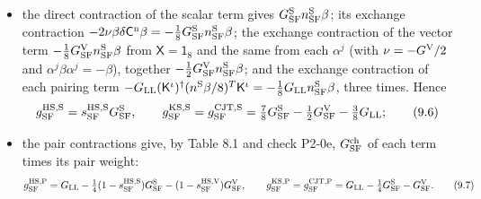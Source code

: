 \documentclass[
  10pt,
]{article}
\providecommand{\tightlist}{%
  \setlength{\itemsep}{0pt}\setlength{\parskip}{0pt}}
\begin{document}
\begin{itemize}
\tightlist
\item
  the direct contraction of the scalar term gives
  \(G^{\rm S}_{\rm SF}n^{\rm S}_{\rm SF}\beta\); its exchange
  contraction
  \(-2\nu\beta\delta\mathsf C^{\rm n}\beta=-\tfrac18G^{\rm S}_{\rm SF}n^{\rm S}_{\rm SF}\beta\);
  the exchange contraction of the vector term
  \(-\tfrac18G^{\rm V}_{\rm SF}n^{\rm S}_{\rm SF}\beta\) from
  \(\mathsf X=\mathsf 1_8\) and the same from each \(\alpha^j\) (with
  \(\nu=-G^{\rm V}/2\) and \(\alpha^j\beta\alpha^j=-\beta\)), together
  \(-\tfrac12G^{\rm V}_{\rm SF}n^{\rm S}_{\rm SF}\beta\); and the
  exchange contraction of each pairing term
  \(-G_{\rm LL}(\mathsf K^\iota)^\dagger(n^{\rm S}\beta/8)^T\mathsf K^\iota=-\tfrac18G_{\rm LL}n^{\rm S}_{\rm SF}\beta\),
  three times. Hence
  \[g^{{\rm HS},{\rm S}}_{\rm SF}=s^{\rm HS,S}_{\rm SF}G^{\rm S}_{\rm SF},\qquad g^{{\rm KS},{\rm S}}_{\rm SF}=g^{{\rm CJT},{\rm S}}_{\rm SF}=\tfrac78G^{\rm S}_{\rm SF}-\tfrac12G^{\rm V}_{\rm SF}-\tfrac38G_{\rm LL};\tag{9.6}\]
\item
  the pair contractions give, by Table 8.1 and check P2-0e,
  \(G^{\rm ch}_{\rm SF}\) of each term times its pair weight:
  \[g^{{\rm HS},{\rm P}}_{\rm SF}=G_{\rm LL}-\tfrac14(1-s^{\rm HS,S}_{\rm SF})G^{\rm S}_{\rm SF}-(1-s^{\rm HS,V}_{\rm SF})G^{\rm V}_{\rm SF},\qquad g^{{\rm KS},{\rm P}}_{\rm SF}=g^{{\rm CJT},{\rm P}}_{\rm SF}=G_{\rm LL}-\tfrac14G^{\rm S}_{\rm SF}-G^{\rm V}_{\rm SF}.\tag{9.7}\]
\end{itemize}
\end{document}
